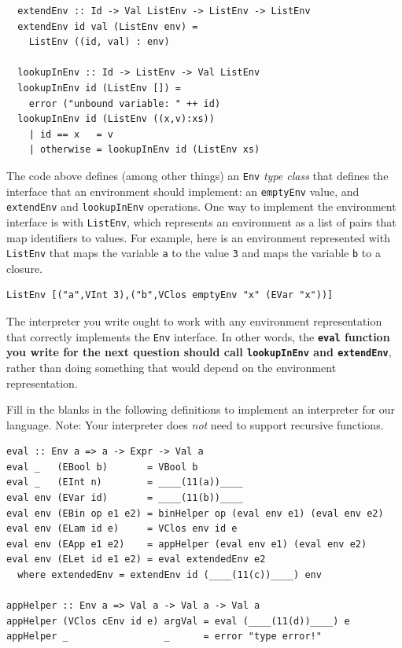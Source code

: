 \documentclass[addpoints]{exam}
\begin{document}
\begin{questions}
\begin{verbatim}
  extendEnv :: Id -> Val ListEnv -> ListEnv -> ListEnv
  extendEnv id val (ListEnv env) =
    ListEnv ((id, val) : env)

  lookupInEnv :: Id -> ListEnv -> Val ListEnv
  lookupInEnv id (ListEnv []) =
    error ("unbound variable: " ++ id)
  lookupInEnv id (ListEnv ((x,v):xs))
    | id == x   = v
    | otherwise = lookupInEnv id (ListEnv xs)
\end{verbatim}

The code above defines (among other things) an \verb|Env| \emph{type class} that defines the interface that an environment should implement: an \verb|emptyEnv| value, and \verb|extendEnv| and \verb|lookupInEnv| operations.  One way to implement the environment interface is with \verb|ListEnv|, which represents an environment as a list of pairs that map identifiers to values.  For example, here is an environment represented with \verb|ListEnv| that maps the variable \verb|a| to the value \verb|3| and maps the variable \verb|b| to a closure.

\begin{verbatim}
ListEnv [("a",VInt 3),("b",VClos emptyEnv "x" (EVar "x"))]
\end{verbatim}

The interpreter you write ought to work with any environment representation that correctly implements the \verb|Env| interface.  In other words, the \textbf{\texttt{eval} function you write for the next question should call \texttt{lookupInEnv} and \texttt{extendEnv}}, rather than doing something that would depend on the environment representation.

\newpage

\question Fill in the blanks in the following definitions to implement an interpreter for our language.
Note: Your interpreter does \emph{not} need to support recursive functions.

\begin{verbatim}
eval :: Env a => a -> Expr -> Val a
eval _   (EBool b)       = VBool b
eval _   (EInt n)        = ____(11(a))____
eval env (EVar id)       = ____(11(b))____
eval env (EBin op e1 e2) = binHelper op (eval env e1) (eval env e2)
eval env (ELam id e)     = VClos env id e
eval env (EApp e1 e2)    = appHelper (eval env e1) (eval env e2)
eval env (ELet id e1 e2) = eval extendedEnv e2
  where extendedEnv = extendEnv id (____(11(c))____) env

appHelper :: Env a => Val a -> Val a -> Val a
appHelper (VClos cEnv id e) argVal = eval (____(11(d))____) e
appHelper _                 _      = error "type error!"


\end{verbatim}
\end{questions}
\end{document}
